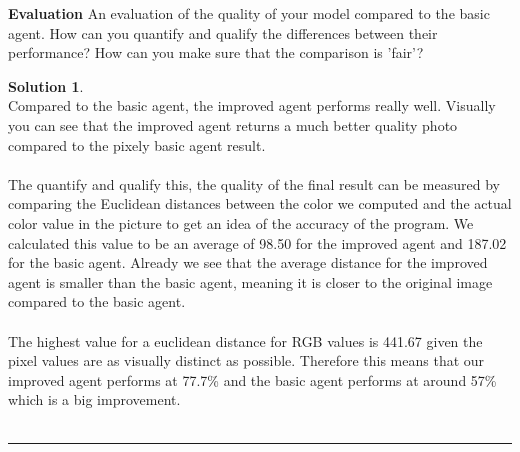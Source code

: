 \documentclass{article}
\theoremstyle{definition}
\def\fline{\rule{0.75\linewidth}{0.5pt}}
\newcommand{\finishline}{\vspace{-15pt}\begin{center}\fline\end{center}}
\newtheorem*{solution*}{Solution}
\newenvironment{solution}{\begin{solution*}}{{\finishline} \end{solution*}}
\begin{document}
    \textbf{Evaluation}
        An evaluation of the quality of your model compared to the basic agent. How can you quantify and qualify the differences between their performance? How can you make sure that the comparison is 'fair'? 
        \begin{solution} \hfill \\
        Compared to the basic agent, the improved agent performs really well. Visually you can see that the improved agent returns a much better quality photo compared to the pixely basic agent result.\\\\
        The quantify and qualify this, the quality of the final result can be measured by comparing the Euclidean distances between the color we computed and the actual color value in the picture to get an idea of the accuracy of the program. We calculated this value to be an average of 98.50 for the improved agent and 187.02 for the basic agent. Already we see that the average distance for the improved agent is smaller than the basic agent, meaning it is closer to the original image compared to the basic agent. \\\\
        The highest value for a euclidean distance for RGB values is 441.67 given the pixel values are as visually distinct as possible. Therefore this means that our improved agent performs at 77.7\% and the basic agent performs at around 57\% which is a big improvement.\\\\
    
        \end{solution}\\\\
        
\end{document}

